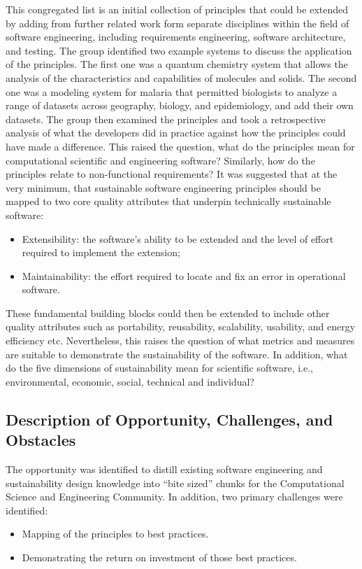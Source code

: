 This congregated list is an initial collection of principles that could be
extended by adding from further related work form separate disciplines within
the field of software engineering, including requirements engineering, software
architecture, and testing. The group identified two example systems to discuss
the application of the principles. The first one was a quantum chemistry system
that allows the analysis of the characteristics and capabilities of molecules
and solids. The second one was a modeling system for malaria that permitted
biologists to analyze a range of datasets across geography, biology, and
epidemiology, and add their own datasets. The group then examined the principles
and took a retrospective analysis of what the developers did in practice against
how the principles could have made a difference. This raised the question, what
do the principles mean for computational scientific and engineering software?
Similarly, how do the principles relate to non-functional requirements? It was
suggested that at the very minimum, that sustainable software engineering
principles should be mapped to two core quality attributes that underpin
technically sustainable software:
\begin{itemize}
\item Extensibility: the software's ability to be extended and the level of
effort required to implement the extension;

\item Maintainability: the effort required to locate and fix an error in
operational software.

\end{itemize}
These fundamental building blocks could then be extended to include other
quality attributes such as portability, reusability, scalability, usability, and
energy efficiency etc. Nevertheless, this raises the question of what metrics
and measures are suitable to demonstrate the sustainability of the software. In
addition, what do the five dimensions of sustainability mean for scientific
software, i.e., environmental, economic, social, technical and individual?


\subsection{Description of Opportunity, Challenges, and Obstacles}
The opportunity was identified to distill existing software engineering and
sustainability design knowledge into ``bite sized'' chunks for the Computational
Science and Engineering Community. In addition, two primary challenges were
identified:
\begin{itemize}
\item Mapping of the principles to best practices.
\item Demonstrating the return on investment of those best practices.
\end{itemize}

